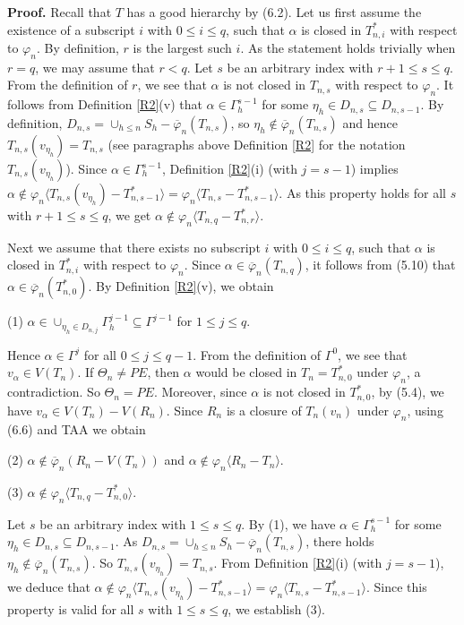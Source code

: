 \documentclass[11pt]{article}
\newcommand{\phibar}{\overline{\varphi}}
\newcommand{\phiv}{\varphi}
\begin{document}
{\bf Proof.}
Recall that $T$ has a good hierarchy by (6.2).   Let us first assume the existence of a subscript $i$ with $0\le i \le q$, 
such that $\alpha$ is closed in $T^*_{n,i}$ with respect to $\varphi_n$. By definition, $r$ is the largest such $i$. 
As the statement holds trivially when $r=q$, we may assume that $r<q$. Let $s$ be an arbitrary index with $r+1\leq s\leq q$. 
From the definition of $r$, we see that $\alpha$ is not closed in $T_{n,s}$ with respect to $\varphi_n$. It follows from Definition \ref{R2}(v)
that $\alpha\in\Gamma^{s-1}_h$ for some $\eta_h\in D_{n,s}\subseteq D_{n,s-1}$. By definition, $D_{n,s}=\cup_{h\leq n}S_h-\phibar_n(T_{n,s})$, 
so $\eta_h\notin\phibar_n(T_{n,s})$ and hence $T_{n,s}(v_{\eta_h})= T_{n,s}$ (see paragraphs above Definition \ref{R2} for the notation 
$T_{n,s}(v_{\eta_h})$). Since $\alpha\in\Gamma^{s-1}_h$, Definition \ref{R2}(i) (with $j=s-1$)
implies $\alpha \notin \phiv_n \langle T_{n,s}(v_{\eta_h})-T_{n,s-1}^* \rangle=\phiv_n \langle T_{n,s}-T_{n,s-1}^* \rangle$. As this property holds 
for all $s$ with $r+1\leq s\leq q$, we get $\alpha \notin \varphi_n \langle T_{n,q}- T^*_{n,r} \rangle$.

Next we assume that there exists no subscript $i$ with $0\le i \le q$, such that $\alpha$ is closed in $T^*_{n,i}$ with 
respect to $\varphi_n$. Since $\alpha\in \phibar_n(T_{n,q})$, it follows from (5.10) that $\alpha  \in \phibar_n(T_{n,0}^*)$.
By Definition \ref{R2}(v), we obtain 

(1) $\alpha\in \cup_{\eta_h\in D_{n,j}}\Gamma^{j-1}_h \subseteq \Gamma^{j-1}$ for $1 \le j \le q$. 

\noindent Hence $\alpha\in\Gamma^j$ for all $0 \le j \le q-1$. From the definition of $\Gamma^0$, we see that $v_{\alpha} 
\in V(T_n)$. If $\Theta_n\neq PE$, then $\alpha$ would be closed in $T_{n}=T_{n,0}^*$ under $\varphi_n$, a contradiction. 
So $\Theta_n=PE$. Moreover, since $\alpha$ is not closed in $T^*_{n,0}$, by (5.4), we have
$v_{\alpha} \in V(T_n)-V(R_n)$. Since $R_n$ is a closure of $T_n(v_n)$ under $\varphi_n$, using (6.6) and TAA we obtain 

(2) $\alpha \notin \overline{\varphi}_n (R_n-V(T_n))$ and $\alpha \notin \varphi_n \langle R_n-T_n \rangle$.

(3) $\alpha \notin \varphi_n \langle T_{n,q}-T_{n,0}^* \rangle$.

Let $s$ be an arbitrary index with $1\le s \le q$.  By (1), we have $\alpha\in\Gamma^{s-1}_h$ for some $\eta_h \in D_{n, s}\subseteq D_{n,s-1}$. 
As $D_{n,s}=\cup_{h\leq n}S_h-\phibar_n(T_{n,s})$, there holds $\eta_h\notin\phibar_n(T_{n,s})$. So $T_{n,s}(v_{\eta_h})= T_{n,s}$.
From Definition \ref{R2}(i) (with $j=s-1$),  we deduce that $\alpha \notin \phiv_n \langle T_{n,s}(v_{\eta_h})-T_{n,s-1}^* \rangle=
\phiv_n \langle T_{n,s}-T_{n,s-1}^* \rangle$. Since this property is valid for all $s$ with $1\le s \le q$, we establish (3).
\end{document}
